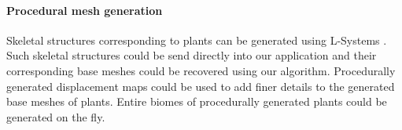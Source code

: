 \paragraph{Procedural mesh generation}
Skeletal structures corresponding to plants can be generated using L-Systems \cite{lplants}.
Such skeletal structures could be send directly into our application and their corresponding base meshes could be recovered using our algorithm.
Procedurally generated displacement maps could be used to add finer details to the generated base meshes of plants.
Entire biomes of procedurally generated plants could be generated on the fly.
